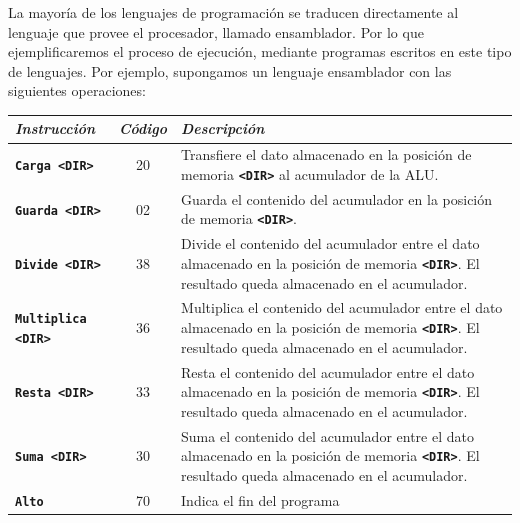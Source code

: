 \documentclass[11pt,spanish]{article}
\providecommand{\tabularnewline}{\\}
\begin{document}
La mayoría de los lenguajes de programación se traducen directamente
al lenguaje que provee el procesador, llamado ensamblador. Por lo
que ejemplificaremos el proceso de ejecución, mediante programas escritos
en este tipo de lenguajes. Por ejemplo, supongamos un lenguaje ensamblador
con las siguientes operaciones: \cite{key-2}
\begin{center}
\begin{longtable}[c]{lc>{\raggedright}p{10cm}}
\textbf{\emph{Instrucción}} & \textbf{\emph{Código}} & \textbf{\emph{Descripción}}\tabularnewline
\hline 
\endhead
\texttt{\textbf{Carga <DIR>}} & 20 & Transfiere el dato almacenado en la posición de memoria \texttt{\textbf{<DIR>}}
al acumulador de la ALU.\tabularnewline
\hline 
\texttt{\textbf{Guarda <DIR>}} & 02 & Guarda el contenido del acumulador en la posición de memoria \texttt{\textbf{<DIR>}}.\tabularnewline
\hline 
\texttt{\textbf{Divide <DIR>}} & 38 & Divide el contenido del acumulador entre el dato almacenado en la
posición de memoria \texttt{\textbf{<DIR>}}. El resultado queda almacenado
en el acumulador.\tabularnewline
\hline 
\texttt{\textbf{Multiplica <DIR>}} & 36 & Multiplica el contenido del acumulador entre el dato almacenado en
la posición de memoria \texttt{\textbf{<DIR>}}. El resultado queda
almacenado en el acumulador.\tabularnewline
\hline 
\texttt{\textbf{Resta <DIR>}} & 33 & Resta el contenido del acumulador entre el dato almacenado en la posición
de memoria \texttt{\textbf{<DIR>}}. El resultado queda almacenado
en el acumulador.\tabularnewline
\hline 
\texttt{\textbf{Suma <DIR>}} & 30 & Suma el contenido del acumulador entre el dato almacenado en la posición
de memoria \texttt{\textbf{<DIR>}}. El resultado queda almacenado
en el acumulador.\tabularnewline
\hline 
\texttt{\textbf{Alto}} & 70 & Indica el fin del programa\tabularnewline
\end{longtable}
\par\end{center}
\end{document}
